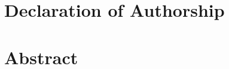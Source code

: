  

\addtocounter{page}{-1}

\newpage
\chapter*{Declaration of Authorship}
\thispagestyle{empty}


\thispagestyle{empty}
\cleardoublepage

\addtocounter{page}{-2}
\setcounter{tocdepth}{1}
\tableofcontents
 \clearpage


%
\renewcommand{\chaptermark}[1]{}
\chaptermark{Abstract}


\chapter*{Abstract}

\clearpage
\renewcommand{\sectionmark}[1]{ \markright{ \uppercase{\thechapter \ #1}}{}}

\renewcommand{\chaptermark}[1]{ \markboth{ \uppercase{#1}}{}} 
\renewcommand{\sectionmark}[1]{ \markright{ \uppercase{#1}}{}} 





\clearpage
%



\setlength{\belowdisplayskip}{0.5cm}
\setlength{\belowdisplayshortskip}{0.5cm}
\renewcommand{\chaptermark}[1]{\markboth{\uppercase{\chaptername \ \thechapter.\ #1}}{}}
\renewcommand{\sectionmark}[1]{\markright{\uppercase{\thesection.\ #1}}{}}

%
%
%
%
%
%	
%
%
%
%
%
%
%
%
%
%
%
%
%
%
%




 


